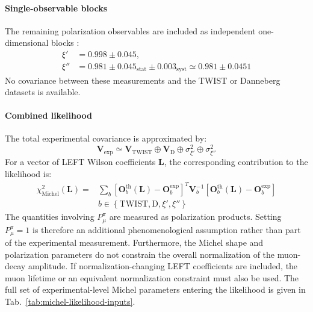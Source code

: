 \paragraph{Single-observable blocks}
The remaining polarization observables are included as independent
one-dimensional blocks \cite{burkard1985muon,prieels2014measurement}:
\begin{align}
  \xi'  &= 0.998\pm0.045,\\
  \xi'' &= 0.981
           \pm0.045_{\mathrm{stat}}
           \pm0.003_{\mathrm{syst}}
         \simeq 0.981\pm0.0451
\end{align}
No covariance between these measurements and the TWIST or Danneberg
datasets is available.
\paragraph{Combined likelihood}
The total experimental covariance is approximated by:
\begin{equation}
  \bm{V}_{\mathrm{exp}}
  \simeq
  \bm{V}_{\mathrm{TWIST}}
  \oplus
  \bm{V}_{\mathrm{D}}
  \oplus
  \sigma_{\xi'}^2
  \oplus
  \sigma_{\xi''}^2
  \label{eq:combined-michel-covariance}
\end{equation}
For a vector of LEFT Wilson coefficients $\bm{L}$, the corresponding
contribution to the likelihood is:
\begin{align}
  \chi^2_{\mathrm{Michel}}(\bm{L})
  =
  &\sum_b
  \left[
    \bm{O}^{\mathrm{th}}_b(\bm{L})
    -
    \bm{O}^{\mathrm{exp}}_b
  \right]^T
  \bm{V}_b^{-1}
  \left[
    \bm{O}^{\mathrm{th}}_b(\bm{L})
    -
    \bm{O}^{\mathrm{exp}}_b
  \right]
  \nonumber\\
  &b\in
  \left\{
    \mathrm{TWIST},
    \mathrm{D},
    \xi',
    \xi''
  \right\}
  \label{eq:michel-chi2}
\end{align}
The quantities involving $P_\mu^\pi$ are measured as polarization products. Setting $P_\mu^\pi=1$ is therefore an additional
phenomenological assumption rather than part of the experimental
measurement. Furthermore, the Michel shape and polarization parameters do not constrain the overall normalization of the muon-decay amplitude. If normalization-changing LEFT coefficients are included, the muon
lifetime or an equivalent normalization constraint must also be used. The full set of experimental-level Michel parameters entering the likelihood is given in Tab.~\ref{tab:michel-likelihood-inputs}.
